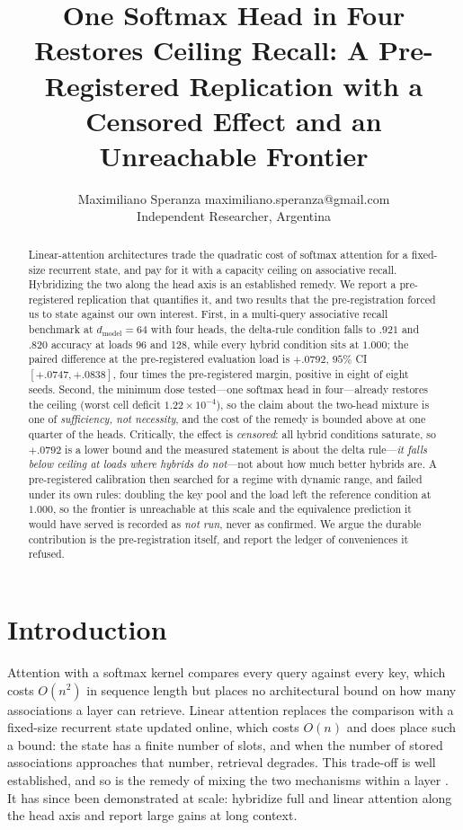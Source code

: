 \documentclass{article}
\title{One Softmax Head in Four Restores Ceiling Recall: A Pre-Registered
Replication with a Censored Effect and an Unreachable Frontier}
\author{\name Maximiliano Speranza \email maximiliano.speranza@gmail.com \\
        \addr Independent Researcher, Argentina}
\begin{document}
\maketitle

\begin{abstract}
Linear-attention architectures trade the quadratic cost of softmax attention for a
fixed-size recurrent state, and pay for it with a capacity ceiling on associative recall.
Hybridizing the two along the head axis is an established remedy. We report a pre-registered
replication that quantifies it, and two results that the pre-registration forced us to state
against our own interest. First, in a multi-query associative recall benchmark at
$d_{\text{model}}=64$ with four heads, the delta-rule condition falls to $.921$ and $.820$
accuracy at loads 96 and 128, while every hybrid condition sits at $1.000$; the paired
difference at the pre-registered evaluation load is $+.0792$, $95\%$ CI $[+.0747, +.0838]$,
four times the pre-registered margin, positive in eight of eight seeds. Second, the minimum
dose tested---one softmax head in four---already restores the ceiling (worst cell deficit
$1.22\times10^{-4}$), so the claim about the two-head mixture is one of \emph{sufficiency,
not necessity}, and the cost of the remedy is bounded above at one quarter of the heads.
Critically, the effect is \emph{censored}: all hybrid conditions saturate, so $+.0792$ is a
lower bound and the measured statement is about the delta rule---\emph{it falls below ceiling
at loads where hybrids do not}---not about how much better hybrids are. A pre-registered
calibration then searched for a regime with dynamic range, and failed under its own rules:
doubling the key pool and the load left the reference condition at $1.000$, so the frontier is
unreachable at this scale and the equivalence prediction it would have served is recorded as
\emph{not run}, never as confirmed. We argue the durable contribution is the pre-registration
itself, and report the ledger of conveniences it refused.
\end{abstract}

\section{Introduction}

Attention with a softmax kernel compares every query against every key, which costs
$O(n^2)$ in sequence length but places no architectural bound on how many associations a
layer can retrieve. Linear attention replaces the comparison with a fixed-size recurrent
state updated online, which costs $O(n)$ and does place such a bound: the state has a finite
number of slots, and when the number of stored associations approaches that number, retrieval
degrades. This trade-off is well established, and so is the remedy of mixing the two
mechanisms within a layer \citep{arora2023zoology,arora2024simple,yang2024gated}. It has
since been demonstrated at scale: \citet{tan2026hydrahead} hybridize full and linear
attention along the head axis and report large gains at long context.
\end{document}
